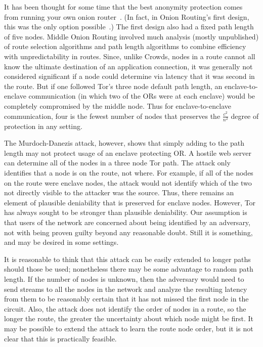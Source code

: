 \documentclass{llncs}
\begin{document}
It has been thought for some time that the best anonymity protection
comes from running your own onion router~\cite{or-pet00,tor-design}.
(In fact, in Onion Routing's first design, this was the only option
possible~\cite{or-ih96}.) The first design also had a fixed path
length of five nodes. Middle Onion Routing involved much analysis
(mostly unpublished) of route selection algorithms and path length
algorithms to combine efficiency with unpredictability in routes.
Since, unlike Crowds, nodes in a route cannot all know the ultimate
destination of an application connection, it was generally not
considered significant if a node could determine via latency that it
was second in the route. But if one followed Tor's three node default
path length, an enclave-to-enclave communication (in which two of the
ORs were at each enclave) would be completely compromised by the
middle node. Thus for enclave-to-enclave communication, four is the fewest
number of nodes that preserves the $\frac{c^2}{n^2}$ degree of protection
in any setting.

The Murdoch-Danezis attack, however, shows that simply adding to the
path length may not protect usage of an enclave protecting OR\@.  A
hostile web server can determine all of the nodes in a three node Tor
path. The attack only identifies that a node is on the route, not
where. For example, if all of the nodes on the route were enclave
nodes, the attack would not identify which of the two not directly
visible to the attacker was the source.  Thus, there remains an
element of plausible deniability that is preserved for enclave nodes.
However, Tor has always sought to be stronger than plausible
deniability. Our assumption is that users of the network are concerned
about being identified by an adversary, not with being proven guilty
beyond any reasonable doubt. Still it is something, and may be desired
in some settings.

It is reasonable to think that this attack can be easily extended to
longer paths should those be used; nonetheless there may be some
advantage to random path length. If the number of nodes is unknown,
then the adversary would need to send streams to all the nodes in the
network and analyze the resulting latency from them to be reasonably
certain that it has not missed the first node in the circuit. Also,
the attack does not identify the order of nodes in a route, so the
longer the route, the greater the uncertainty about which node might
be first. It may be possible to extend the attack to learn the route
node order, but it is not clear that this is practically feasible.
\end{document}
